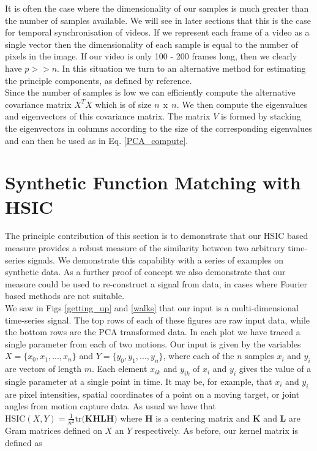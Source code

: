 It is often the case where the dimensionality of our samples is much greater than the number of samples available. We will see in later sections that this is the case for temporal synchronisation of videos. If we represent each frame of a video as a single vector then the dimensionality of each sample is equal to the number of pixels in the image. If our video is only 100 - 200 frames long, then we clearly have $p >> n$. In this situation we turn to an alternative method for estimating the principle components, as defined by reference. \\

Since the number of samples is low we can efficiently compute the alternative covariance matrix $X^{T} X$ which is of size $n\:\:\text{x}\:\:n$. We then compute the eigenvalues and eigenvectors of this covariance matrix. The matrix $V$ is formed by stacking the eigenvectors in columns according to the size of the corresponding eigenvalues and can then be used as in Eq. \ref{PCA_compute}.\\

\section{Synthetic Function Matching with HSIC}

The principle contribution of this section is to demonstrate that our HSIC based measure provides a robust measure of the similarity between two arbitrary time-series signals. We demonstrate this capability with a series of examples on synthetic data. As a further proof of concept we also demonstrate that our measure could be used to re-construct a signal from data, in cases where Fourier based methods are not suitable. \\

We saw in Figs \ref{getting_up} and \ref{walks} that our input is a multi-dimensional time-series signal. The top rows of each of these figures are raw input data, while the bottom rows are the PCA transformed data. In each plot we have traced a single parameter from each of two motions. Our input is given by the variables $X = \{x_0, x_1, ..., x_n\}$ and $Y = \{y_0, y_1, ..., y_n\}$, where each of the $n$ samples $x_i$ and $y_i$ are vectors of length $m$. Each element $x_{ik}$ and $y_{ik}$ of $x_i$ and $y_i$ gives the value of a single parameter at a single point in time. It may be, for example, that $x_i$ and $y_i$ are pixel intensities, spatial coordinates of a point on a moving target, or joint angles from motion capture data. As usual we have that $\text{HSIC}(X, Y) = \frac{1}{n^2}\text{tr}\textbf{(KHLH)}$ where $\textbf{H}$ is a centering matrix and $\textbf{K}$ and $\textbf{L}$ are Gram matrices defined on $X$ an $Y$ respectively. As before, our kernel matrix is defined as

